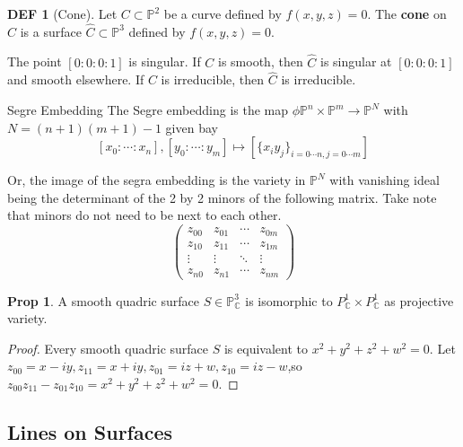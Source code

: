 \documentclass[twocolumn]{article}
\renewcommand{\emph}[1]{{\color{blue!70!black}\sffamily\bfseries #1}}
\newcommand{\C}{\mathbb{C}}
\renewcommand{\P}{\mathbb{P}}
\theoremstyle{definition}
\newtheorem{prop}[thm]{Prop}
\newtheorem{defi}[thm]{DEF}
\theoremstyle{remark}
\begin{document}
\begin{defi}[Cone]
	Let $C \subset \P^2$ be a curve defined by $f(x, y,z) = 0$. The \emph{cone} on $C$ is a surface $\hat{C} \subset \P^3$ defined by $f(x,y,z) = 0$.

	The point $[0:0:0:1]$ is singular.
	If $C$ is smooth, then $\hat{C}$ is singular at $[0:0:0:1]$ and smooth elsewhere.
	If $C$ is irreducible, then $\hat{C}$ is irreducible.
\end{defi}

\begin{fthm}{Segre Embedding}{}
	The Segre embedding is the map $\phi \P^n \times \P^m \rightarrow \P^N$ with $N = (n+1)(m+1) - 1$ given bay 
	$$
	[x_0: \cdots : x_n] , [y_0: \cdots: y_m] \mapsto [\{x_iy_j\}_{i=0 \cdots n, j=0 \cdots m}]
	$$

	Or, the image of the segra embedding is the variety in $\P^{N}$ with vanishing ideal being the determinant of the 2 by 2 minors of the following matrix. 
	Take note that minors do not need to be next to each other.
	$$ 
	\begin{pmatrix}
		z_{00} & z_{01} & \cdots & z_{0m} \\ 
		z_{10} & z_{11} & \cdots & z_{1m} \\ 
		\vdots & \vdots & \ddots & \vdots \\ 
		z_{n0} & z_{n1} & \cdots & z_{nm} 
	\end{pmatrix}
	$$
\end{fthm}

\begin{prop}
	A smooth quadric surface $S \in \P^3_{\C}$ is isomorphic to $P^1_{\C} \times P^1_{\C}$ as projective variety.
\end{prop}
\begin{proof}
	Every smooth quadric surface $S$ is equivalent to $x^2 + y^2 + z^2 + w^2 = 0$. Let $z_{00} = x-iy, z_{11} = x+iy, z_{01} = iz + w, z_{10} = iz -w$,so $z_{00} z_{11} - z_{01} z_{10} = x^2 + y^2 + z^2 + w^2 = 0$.
\end{proof}

\subsection{Lines on Surfaces}
\end{document}

